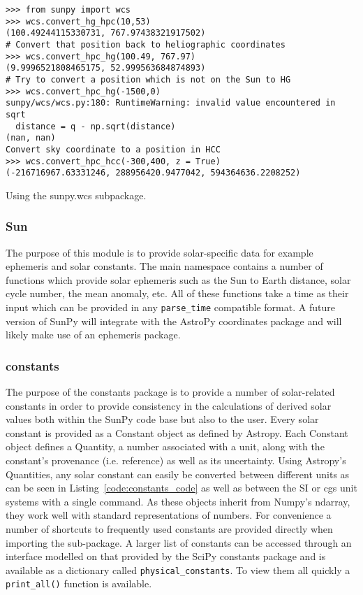 \begin{listing}[H]
\begin{verbatim}
>>> from sunpy import wcs
>>> wcs.convert_hg_hpc(10,53)
(100.49244115330731, 767.97438321917502)
# Convert that position back to heliographic coordinates
>>> wcs.convert_hpc_hg(100.49, 767.97)
(9.9996521808465175, 52.999563684874893)
# Try to convert a position which is not on the Sun to HG
>>> wcs.convert_hpc_hg(-1500,0)
sunpy/wcs/wcs.py:180: RuntimeWarning: invalid value encountered in sqrt
  distance = q - np.sqrt(distance)
(nan, nan)
Convert sky coordinate to a position in HCC
>>> wcs.convert_hpc_hcc(-300,400, z = True)
(-216716967.63331246, 288956420.9477042, 594364636.2208252)
\end{verbatim}
\caption{Using the sunpy.wcs subpackage.}
\label{code:wcs_code}
\end{listing}

\subsubsection{Sun}\label{ssec:util:sun}
The purpose of this module is to provide solar-specific data for example ephemeris and
solar constants. The main namespace contains a number of functions which provide solar
ephemeris such as the Sun to Earth distance, solar cycle number, the mean 
anomaly, etc.
All of these functions take a time as their input which can be provided in any 
\texttt{parse\_time}
compatible format. 
A future version of SunPy will integrate with the AstroPy coordinates package and will 
likely make use of an ephemeris package.

\subsubsection{constants}\label{ssec:util:const}
The purpose of the constants package is to provide a number of solar-related 
constants in order to provide consistency in the calculations of derived solar 
values both within the SunPy code base but also to the user. Every solar 
constant is provided as a Constant object as defined by Astropy. Each 
Constant object defines a Quantity, a number associated with a unit, along with 
the constant's provenance (i.e. reference) as well as its uncertainty. Using 
Astropy's Quantities, any solar constant can easily be converted between 
different units as can be seen in Listing~\ref{code:constants_code} as well
as between the SI or cgs unit systems with a single command.  As these objects inherit from 
Numpy's ndarray, they work well with standard representations of numbers.
For convenience a number of shortcuts to frequently used constants are provided 
directly when importing the sub-package. A larger list of constants can be 
accessed through an interface modelled on that provided by the SciPy constants 
package and is available as a dictionary called \texttt{physical\_constants}. 
To view them all quickly a \texttt{print\_all()} function is available.

